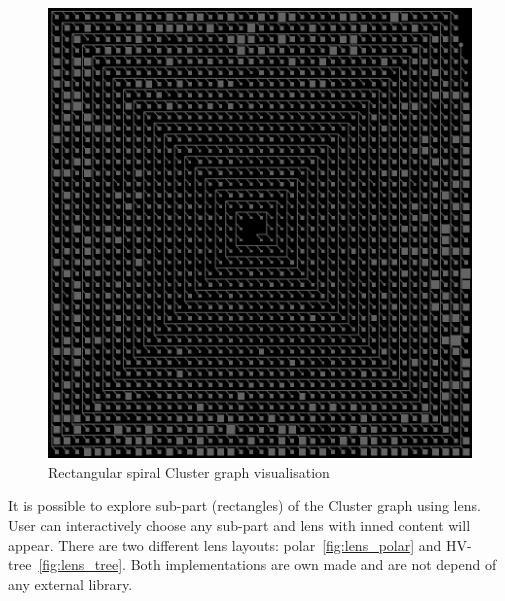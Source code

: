 \begin{figure}[h!]
\centering
\includegraphics[scale=0.4]{pictures/cluster_visualisation.png}
\caption{Rectangular spiral Cluster graph visualisation}
\label{fig:cluster_visualisation}
\end{figure}

It is possible to explore sub-part (rectangles) of the Cluster graph using lens. User can interactively choose any sub-part and lens with inned content will appear. There are two different lens layouts: polar~\ref{fig:lens_polar} and HV-tree~\ref{fig:lens_tree}. Both implementations are own made and are not depend of any external library.

